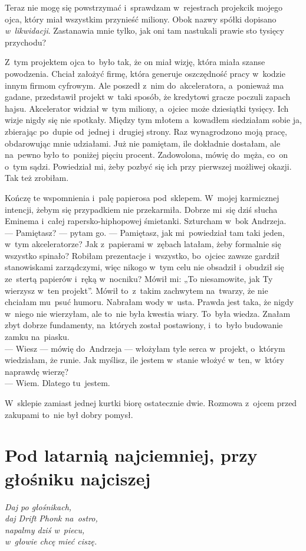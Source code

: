 \documentclass[9pt, a5paper]{memoir}
\begin{document}
Teraz nie mogę się powstrzymać i~sprawdzam w~rejestrach projekcik mojego ojca, który miał wszystkim przynieść miliony. Obok nazwy spółki dopisano \textit{w~likwidacji}. Zastanawia mnie tylko, jak oni tam nastukali prawie sto tysięcy przychodu?

Z~tym projektem ojca to~było tak, że on miał wizję, która miała szanse powodzenia. Chciał założyć firmę, która generuje oszczędność pracy w~kodzie innym firmom cyfrowym. Ale poszedł z~nim do~akceleratora, a~ponieważ ma gadane, przedstawił projekt w~taki sposób, że kredytowi gracze poczuli zapach hajsu. Akcelerator widział w~tym miliony, a~ojciec może dziesiątki tysięcy. Ich wizje nigdy się nie spotkały. Między tym młotem a~kowadłem siedziałam sobie ja, zbierając po~dupie od~jednej i~drugiej strony. Raz wynagrodzono moją pracę, obdarowując mnie udziałami. Już nie pamiętam, ile dokładnie dostałam, ale na~pewno było to~poniżej pięciu procent. Zadowolona, mówię do~męża, co~on o~tym sądzi. Powiedział mi, żeby pozbyć się ich przy pierwszej możliwej okazji. Tak też zrobiłam.

Kończę te wspomnienia i~palę papierosa pod~sklepem. W~mojej karmicznej intencji, żebym się przypadkiem nie przekarmiła. Dobrze mi~się dziś słucha Eminema i~całej rapersko-hiphopowej śmietanki. Szturcham w~bok Andrzeja.\\
--- Pamiętasz? --- pytam go. --- Pamiętasz, jak mi~powiedział tam taki jeden, w~tym akceleratorze? Jak z~papierami w~zębach latałam, żeby formalnie się wszystko spinało? Robiłam prezentacje i~wszystko, bo~ojciec zawsze gardził stanowiskami zarządczymi, więc nikogo w~tym celu nie obsadził i~obudził się ze~stertą papierów i~ręką w~nocniku? Mówił mi: „To niesamowite, jak Ty wierzysz w~ten projekt”. Mówił to~z~takim zachwytem na~twarzy, że nie chciałam mu~psuć humoru. Nabrałam wody w~usta. Prawda jest taka, że nigdy w~niego nie wierzyłam, ale to~nie była kwestia wiary. To~była wiedza. Znałam zbyt dobrze fundamenty, na~których został postawiony, i~to~było budowanie zamku na~piasku.\\
--- Wiesz --- mówię do~Andrzeja --- włożyłam tyle serca w~projekt, o~którym wiedziałam, że runie. Jak myślisz, ile jestem w~stanie włożyć w~ten, w~który naprawdę wierzę?\\
--- Wiem. Dlatego tu~jestem.

W~sklepie zamiast jednej kurtki biorę ostatecznie dwie. Rozmowa z~ojcem przed zakupami to~nie był dobry pomysł.

\newpage
\section{Pod latarnią najciemniej, przy głośniku najciszej}
{
\itshape
Daj po głośnikach,\\
daj Drift Phonk na~ostro,\\
napalmy dziś w~piecu,\\
w~głowie chcę mieć ciszę.
}
\end{document}
